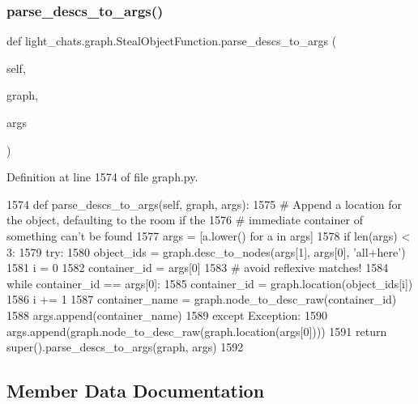 \subsubsection{\texorpdfstring{parse\+\_\+descs\+\_\+to\+\_\+args()}{parse\_descs\_to\_args()}}
{\footnotesize\ttfamily def light\+\_\+chats.\+graph.\+Steal\+Object\+Function.\+parse\+\_\+descs\+\_\+to\+\_\+args (\begin{DoxyParamCaption}\item[{}]{self,  }\item[{}]{graph,  }\item[{}]{args }\end{DoxyParamCaption})}



Definition at line 1574 of file graph.\+py.


\begin{DoxyCode}
1574     \textcolor{keyword}{def }parse\_descs\_to\_args(self, graph, args):
1575         \textcolor{comment}{# Append a location for the object, defaulting to the room if the}
1576         \textcolor{comment}{# immediate container of something can't be found}
1577         args = [a.lower() \textcolor{keywordflow}{for} a \textcolor{keywordflow}{in} args]
1578         \textcolor{keywordflow}{if} len(args) < 3:
1579             \textcolor{keywordflow}{try}:
1580                 object\_ids = graph.desc\_to\_nodes(args[1], args[0], \textcolor{stringliteral}{'all+here'})
1581                 i = 0
1582                 container\_id = args[0]
1583                 \textcolor{comment}{# avoid reflexive matches!}
1584                 \textcolor{keywordflow}{while} container\_id == args[0]:
1585                     container\_id = graph.location(object\_ids[i])
1586                     i += 1
1587                 container\_name = graph.node\_to\_desc\_raw(container\_id)
1588                 args.append(container\_name)
1589             \textcolor{keywordflow}{except} Exception:
1590                 args.append(graph.node\_to\_desc\_raw(graph.location(args[0])))
1591         \textcolor{keywordflow}{return} super().parse\_descs\_to\_args(graph, args)
1592 
\end{DoxyCode}


\subsection{Member Data Documentation}
\mbox{\label{classlight__chats_1_1graph_1_1StealObjectFunction_a07d054e11c32eecd7c93102de254ffec}} 
